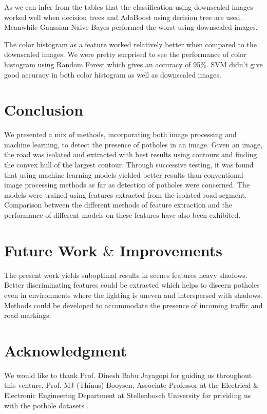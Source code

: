 \documentclass[journal]{IEEEtran}
\begin{document}
As we can infer from the tables that the classification using downscaled images worked well when decision trees and AdaBoost using decision tree are used. Meanwhile Gaussian Naive Bayes performed the worst using downscaled images.

\vspace{0.5cm}

The color histogram as a feature worked relatively better when compared to the downscaled images. We were pretty surprised to see the performance of color histogram using Random Forest which gives an accuracy of 
95$\%$. SVM didn't give good accuracy in both color histogram as well as downscaled images.

\section{Conclusion}
We presented a mix of methods, incorporating both image processing and machine learning, to detect the presence of potholes in an image. Given an image, the road was isolated and extracted with best results using contours and finding the convex hull of the largest contour. Through successive testing, it was found that using machine learning models yielded better results than conventional image processing methods as far as detection of potholes were concerned. The models were trained using features extracted from the isolated road segment. Comparison between the different methods of feature extraction and the performance of different models on these features have also been exhibited.

\section{Future Work $\&$ Improvements}
The present work yields sub\-optimal results in scenes features heavy shadows. Better discriminating features could be extracted which helps to discern potholes even in environments where the lighting is uneven and interspersed with shadows. Methods could be developed to accommodate the presence of incoming traffic and road markings.


\section*{Acknowledgment}
We would like to thank Prof. Dinesh Babu Jayagopi for guiding us throughout this venture, Prof. MJ (Thinus) Booysen, Associate Professor at the Electrical $\&$ Electronic Engineering Department at Stellenbosch University for prividing us with the pothole datasets \cite{dataset}.
\end{document}
